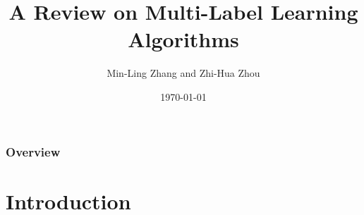 \documentclass{beamer}
\title[Large-Scale Data Analysis Techniques]{A Review on Multi-Label Learning Algorithms} %
\author[Sissy Themeli, Nikiforos Pittaras]{Min-Ling Zhang and Zhi-Hua Zhou} %
\institute[DI-UOA] %
{
	IEEE TRANSACTIONS ON KNOWLEDGE AND DATA ENGINEERING\\ %
	\medskip
}
\date{\today} %
\begin{document}
	
	\begin{frame}
	\titlepage %
\end{frame}

\begin{frame}
\frametitle{Overview} %
\tableofcontents %
\end{frame}


\section{Introduction} %
\end{document}
